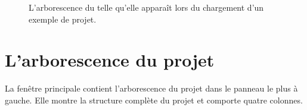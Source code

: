 \documentclass[a4paper,11pt,french]{sphinxmanual}
\begin{document}
\begin{figure}[htbp]
\centering
\capstart

\noindent{}
\caption{L’arborescence du  telle qu’elle apparaît lors du chargement d’un exemple de projet.}\label{\detokenize{usage_project:id1}}\end{figure}


\section{L’arborescence du projet}
\label{\detokenize{usage_project:the-project-tree}}\label{\detokenize{usage_project:a-ui-tree}}
\sphinxAtStartPar
La fenêtre principale contient l’arborescence du projet dans le panneau le plus à gauche. Elle montre la structure complète du projet et comporte quatre colonnes.
\end{document}
